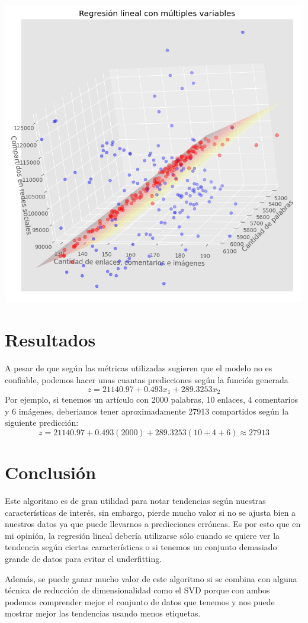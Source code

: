 \documentclass[12pt, letterpaper]{article}
\begin{document}
    \begin{center}
        \includegraphics[width=140mm]{2025-03-23-23-36-29.png}
    \end{center}

    \section{Resultados}
    A pesar de que según las métricas utilizadas sugieren que el modelo no es confiable, podemos hacer unas cuantas predicciones según la función generada
    \begin{equation*}
        z = 21140.97 + 0.493x_{1} + 289.3253x_{2}
    \end{equation*}
    Por ejemplo, si tenemos un artículo con 2000 palabras, 10 enlaces, 4 comentarios y 6 imágenes, deberiamos tener aproximadamente 27913 compartidos según la siguiente predicción:
    \begin{equation*}
        z = 21140.97 + 0.493(2000) + 289.3253(10+4+6) \approx 27913
    \end{equation*}

    \section{Conclusión}
    Este algoritmo es de gran utilidad para notar tendencias según nuestras características de interés, sin embargo, pierde mucho valor si no se ajusta bien a nuestros datos ya que puede llevarnos a predicciones erróneas. Es por esto que en mi opinión, la regresión lineal debería utilizarse sólo cuando se quiere ver la tendencia según ciertas características o si tenemos un conjunto demasiado grande de datos para evitar el underfitting. \par
    Además, se puede ganar mucho valor de este algoritmo si se combina con alguna técnica de reducción de dimensionalidad como el SVD porque con ambos podemos comprender mejor el conjunto de datos que tenemos y nos puede mostrar mejor las tendencias usando menos etiquetas.
\end{document}
